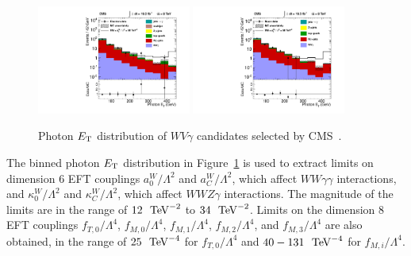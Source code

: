 \begin{figure}[p]
    \centering
    \includegraphics[width=0.45\textwidth]{figures/ss-inclboson-triboson-wvg-ele-cms8tev.pdf}
    \includegraphics[width=0.45\textwidth]{figures/ss-inclboson-triboson-wvg-mu-cms8tev.pdf}
    \caption{Photon $E_{\mathrm{T}}$ distribution of $WV\gamma$ candidates selected by CMS~\cite{Chatrchyan:2014bza}.}
    \label{fig:ss-inclboson-triboson-wvg-cms8tev}
\end{figure}

The binned photon $E_{\mathrm{T}}$ distribution in
Figure~\ref{fig:ss-inclboson-triboson-wvg-cms8tev} is used to extract
limits on dimension 6 EFT couplings $a^W_0/\Lambda^2$ and
$a^W_C/\Lambda^2$, which affect $WW\gamma\gamma$ interactions, and
$\kappa^W_0/\Lambda^2$ and $\kappa^W_C/\Lambda^2$, which affect
$WWZ\gamma$ interactions.  The magnitude of the limits are in the
range of $12\ \TeV^{-2}$ to $34\ \TeV^{-2}$.  Limits
on the dimension 8 EFT couplings $f_{T,0}/\Lambda^4$,
$f_{M,0}/\Lambda^4$, $f_{M,1}/\Lambda^4$, $f_{M,2}/\Lambda^4$, and
$f_{M,3}/\Lambda^4$ are also obtained, in the range of
$25\ \TeV^{-4}$ for $f_{T,0}/\Lambda^4$ and
$40-131\ \TeV^{-4}$ for $f_{M,i}/\Lambda^4$.  

